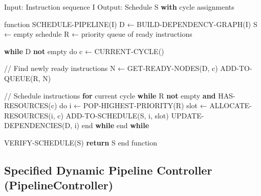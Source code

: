 \documentclass[
  11pt,
]{article}
\newenvironment{Shaded}{}{}
\newcommand{\ControlFlowTok}[1]{\textcolor[rgb]{0.00,0.44,0.13}{\textbf{#1}}}
\newcommand{\KeywordTok}[1]{\textcolor[rgb]{0.00,0.44,0.13}{\textbf{#1}}}
\newcommand{\NormalTok}[1]{#1}
\newcommand{\OperatorTok}[1]{\textcolor[rgb]{0.40,0.40,0.40}{#1}}
\begin{document}
\begin{Shaded}
\begin{Highlighting}[]
\NormalTok{Input: Instruction sequence I}
\NormalTok{Output: Schedule S }\ControlFlowTok{with}\NormalTok{ cycle assignments}

\NormalTok{function SCHEDULE}\OperatorTok{{-}}\NormalTok{PIPELINE(I)}
\NormalTok{    D ← BUILD}\OperatorTok{{-}}\NormalTok{DEPENDENCY}\OperatorTok{{-}}\NormalTok{GRAPH(I)}
\NormalTok{    S ← empty schedule}
\NormalTok{    R ← priority queue of ready instructions}
    
    \ControlFlowTok{while}\NormalTok{ D }\KeywordTok{not}\NormalTok{ empty do}
\NormalTok{        c ← CURRENT}\OperatorTok{{-}}\NormalTok{CYCLE()}
        
        \OperatorTok{//}\NormalTok{ Find newly ready instructions}
\NormalTok{        N ← GET}\OperatorTok{{-}}\NormalTok{READY}\OperatorTok{{-}}\NormalTok{NODES(D, c)}
\NormalTok{        ADD}\OperatorTok{{-}}\NormalTok{TO}\OperatorTok{{-}}\NormalTok{QUEUE(R, N)}
        
        \OperatorTok{//}\NormalTok{ Schedule instructions }\ControlFlowTok{for}\NormalTok{ current cycle}
        \ControlFlowTok{while}\NormalTok{ R }\KeywordTok{not}\NormalTok{ empty }\KeywordTok{and}\NormalTok{ HAS}\OperatorTok{{-}}\NormalTok{RESOURCES(c) do}
\NormalTok{            i ← POP}\OperatorTok{{-}}\NormalTok{HIGHEST}\OperatorTok{{-}}\NormalTok{PRIORITY(R)}
\NormalTok{            slot ← ALLOCATE}\OperatorTok{{-}}\NormalTok{RESOURCES(i, c)}
\NormalTok{            ADD}\OperatorTok{{-}}\NormalTok{TO}\OperatorTok{{-}}\NormalTok{SCHEDULE(S, i, slot)}
\NormalTok{            UPDATE}\OperatorTok{{-}}\NormalTok{DEPENDENCIES(D, i)}
\NormalTok{        end }\ControlFlowTok{while}
\NormalTok{    end }\ControlFlowTok{while}
    
\NormalTok{    VERIFY}\OperatorTok{{-}}\NormalTok{SCHEDULE(S)}
    \ControlFlowTok{return}\NormalTok{ S}
\NormalTok{end function}
\end{Highlighting}
\end{Shaded}

\subsection{Specified Dynamic Pipeline Controller
(PipelineController)}\label{specified-dynamic-pipeline-controller-pipelinecontroller}
\end{document}
